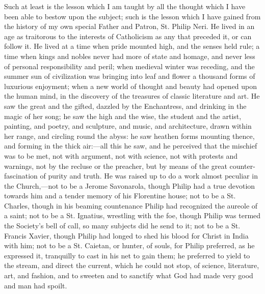 Such at least is the lesson which I am taught by all the thought
which I have been able to bestow upon the subject; such is the lesson
which I have gained from the history of my own special Father and
Patron, St. Philip Neri. He lived in an age as traitorous to the
interests of Catholicism as any that preceded it, or can follow it. He
lived at a time when pride mounted high, and the senses held rule; a
time when kings and nobles never had more of state and homage, and
never less of personal responsibility and peril; when medieval winter
was receding, and the summer sun of civilization was bringing
into leaf and flower a thousand forms of luxurious enjoyment; when a
new world of thought and beauty had opened upon the human mind, in the
discovery of the treasures of classic literature and art. He saw the
great and the gifted, dazzled by the Enchantress, and drinking in the
magic of her song; he saw the high and the wise, the student and the
artist, painting, and poetry, and sculpture, and music, and
architecture, drawn within her range, and circling round the abyss: he
saw heathen forms mounting thence, and forming in the thick air:—all
this he saw, and he perceived that the mischief was to be met, not
with argument, not with science, not with protests and warnings, not
by the recluse or the preacher, but by means of the great
counter-fascination of purity and truth. He was raised up to do a work
almost peculiar in the Church,—not to be a Jerome Savonarola, though
Philip had a true devotion towards him and a tender memory of his
Florentine house; not to be a St. Charles, though in his beaming
countenance Philip had recognized the aureole of a saint; not to be a
St. Ignatius, wrestling with the foe, though Philip was termed the
Society's bell of call, so many subjects did he send to it; not to be
a St. Francis Xavier, though Philip had longed to shed his blood for
Christ in India with him; not to be a St. Caietan, or hunter, of
souls, for Philip preferred, as he expressed it, tranquilly to cast in
his net to gain them; he preferred to yield to the stream, and direct
the current, which he could not stop, of science, literature, art, and
fashion, and to sweeten and to sanctify what God had made very good
and man had spoilt.

